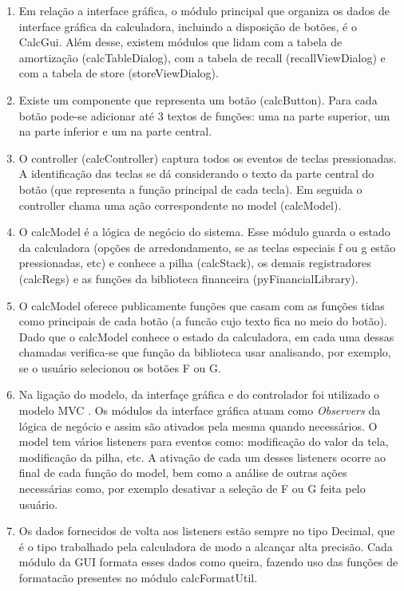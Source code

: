 \begin{enumerate}
 \item Em relação a interface gráfica, o módulo principal que organiza os dados de interface gráfica da calculadora, incluindo a disposição de botões, é o CalcGui. Além desse, existem módulos que lidam com a tabela de amortização (calcTableDialog), com a tabela de recall (recallViewDialog) e com a tabela de store (storeViewDialog). 

\item Existe um componente que representa um botão (calcButton). Para cada botão pode-se adicionar até 3 textos de funções: uma na parte superior, um na parte inferior e um na parte central.

\item O controller (calcController) captura todos os eventos de teclas pressionadas. A identificação das teclas se dá considerando o texto da parte central do botão 
(que representa a função principal de cada tecla). Em seguida o controller chama uma ação correspondente no model (calcModel).

\item O calcModel é a lógica de negócio do sistema. Esse módulo guarda o estado da calculadora (opções de arredondamento, se as teclas especiais f ou g estão pressionadas, etc) e conhece a pilha (calcStack), os demais registradores (calcRegs) e as funções da biblioteca financeira (pyFinancialLibrary).

\item O calcModel oferece publicamente funções que casam com as funções tidas como principais de cada botão (a funcão cujo texto fica no meio do botão). Dado que o calcModel conhece o estado da calculadora, em cada uma dessas chamadas verifica-se que função da biblioteca usar analisando, por exemplo, se o usuário selecionou os botões F ou G.

\item Na ligação do modelo, da interfaçe gráfica e do controlador foi utilizado o modelo MVC \cite {mvc}. Os módulos da interface gráfica atuam como \textit{Observers} da lógica de negócio e assim são ativados pela mesma quando necessários. O model tem vários listeners para eventos como: modificação do valor da tela, modificação da pilha, etc. A ativação de cada um desses listeners ocorre ao final de cada função do model, bem como a análise de outras ações necessárias como, por exemplo desativar a seleção de F ou G feita pelo usuário.

\item Os dados fornecidos de volta aos listeners estão sempre no tipo Decimal, que é o tipo trabalhado pela calculadora de modo a alcançar alta precisão. Cada módulo da GUI formata esses dados como queira, fazendo uso das funções de formatacão presentes no módulo calcFormatUtil.

\end{enumerate}

